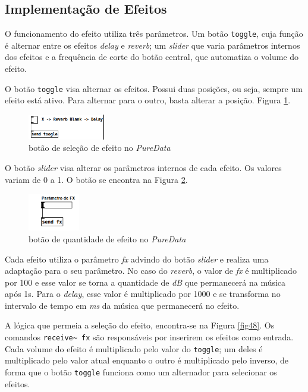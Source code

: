\subsection{Implementação de Efeitos}

O funcionamento do efeito utiliza três parâmetros. Um botão \texttt{toggle}, cuja função é alternar entre os efeitos \textit{delay} e \textit{reverb}; um \textit{slider} que varia parâmetros internos dos efeitos e a frequência de corte do botão central, que automatiza o volume do efeito.

O botão \texttt{toggle} visa alternar os efeitos. Possui duas posições, ou seja, sempre um efeito está ativo. Para alternar para o outro, basta alterar a posição. Figura \ref{fig46}.

\begin{figure}[h]
    \centering
    \includegraphics[width=0.3\textwidth]{figuras/fig46.png}
    \caption{botão de seleção de efeito no \textit{PureData}}
    \label{fig46}
\end{figure}

O botão \textit{slider} visa alterar os parâmetros internos de cada efeito. Os valores variam de 0 a 1. O botão se encontra na Figura \ref{fig47}.

\begin{figure}[h]
    \centering
    \includegraphics[width=0.2\textwidth]{figuras/fig47.png}
    \caption{botão de quantidade de efeito no \textit{PureData}}
    \label{fig47}
\end{figure}

Cada efeito utiliza o parâmetro \textit{fx} advindo do botão \textit{slider} e realiza uma adaptação para o seu parâmetro. No caso do \textit{reverb}, o valor de \textit{fx} é multiplicado por 100 e esse valor se torna a quantidade de \textit{dB} que permanecerá na música após 1s. Para o \textit{delay}, esse valor é multiplicado por 1000 e se transforma no intervalo de tempo em \textit{ms} da música que permanecerá no efeito.

A lógica que permeia a seleção do efeito, encontra-se na Figura \ref{fig48}. Os comandos \texttt{receive\textasciitilde\ fx} são responsáveis por inserirem os efeitos como entrada. Cada volume do efeito é multiplicado pelo valor do \texttt{toggle}; um deles é multiplicado pelo valor atual enquanto o outro é multiplicado pelo inverso, de forma que o botão \texttt{toggle} funciona como um alternador para selecionar os efeitos.

